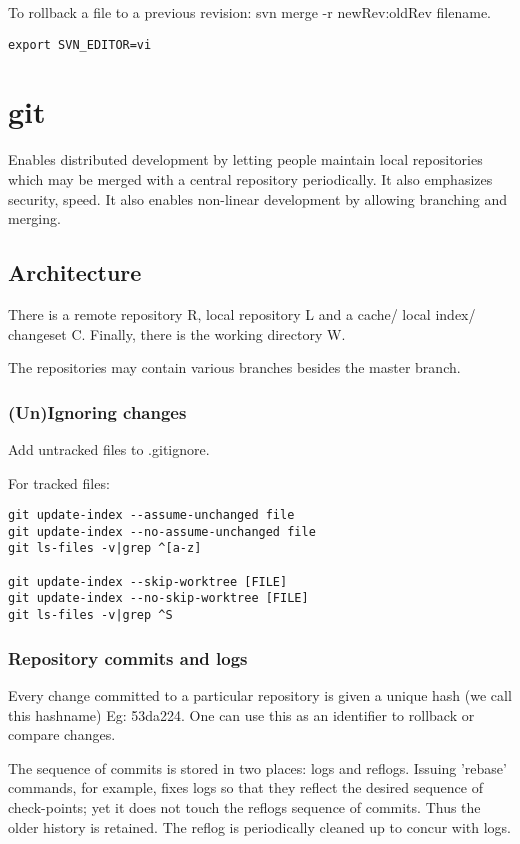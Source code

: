 \documentclass[oneside, article]{memoir}
\begin{document}
To rollback a file to a previous revision: svn merge -r newRev:oldRev filename.

\verb'export SVN_EDITOR=vi'

\section{git}
Enables distributed development by letting people maintain local repositories which may be merged with a central repository periodically. It also emphasizes security, speed. It also enables non-linear development by allowing branching and merging.

\subsection{Architecture}
There is a remote repository R, local repository L and a cache/ local index/ changeset C. Finally, there is the working directory W.

The repositories may contain various branches besides the master branch.

\subsubsection{(Un)Ignoring changes}
Add untracked files to .gitignore.

For tracked files:
\begin{verbatim}
git update-index --assume-unchanged file
git update-index --no-assume-unchanged file
git ls-files -v|grep ^[a-z]

git update-index --skip-worktree [FILE]
git update-index --no-skip-worktree [FILE]
git ls-files -v|grep ^S 

\end{verbatim}


\subsubsection{Repository commits and logs}
Every change committed to a particular repository is given a unique hash (we call this hashname) Eg: 53da224. One can use this as an identifier to rollback or compare changes.

The sequence of commits is stored in two places: logs and reflogs. Issuing 'rebase' commands, for example, fixes logs so that they reflect the desired sequence of check-points; yet it does not touch the reflogs sequence of commits. Thus the older history is retained. The reflog is periodically cleaned up to concur with logs.
\end{document}
